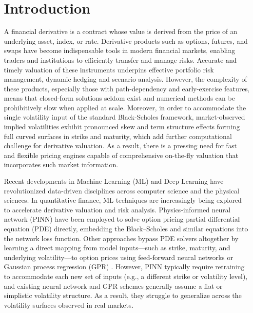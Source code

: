 \documentclass[%
 reprint,
 superscriptaddress,
nobibnotes,
 amsmath,amssymb,
 aps,
]{revtex4-2}
\begin{document}

\section{Introduction}
A financial derivative\cite{hull2016options, shreve2005stochastic} is a contract whose value is derived from the price of an underlying asset, index, or rate. Derivative products such as options\cite{black1973pricing,merton1971theory}, futures, and swaps\cite{flavell2010swaps} have become indispensable tools in modern financial markets, enabling traders and institutions to efficiently transfer and manage risks. Accurate and timely valuation of these instruments underpins effective portfolio risk management\cite{lee2010handbook}, dynamic hedging\cite{taleb1997dynamic} and scenario analysis\cite{hassani2016scenario}. However, the complexity of these products, especially those with path-dependency and early-exercise features, means that closed-form solutions seldom exist and numerical methods\cite{shreve2005stochastic, wilmott1995mathematics} can be prohibitively slow when applied at scale. Moreover, in order to accommodate the single volatility input of the standard Black-Scholes framework, market-observed implied volatilities exhibit pronounced skew and term structure effects \cite{derman2016volatility} forming full curved surfaces in strike and maturity, which add further computational challenge for derivative valuation. As a result, there is a pressing need for fast and flexible pricing engines capable of comprehensive on-the-fly valuation that incorporates such market information.

Recent developments in Machine Learning (ML)\cite{murphy2012machine,carleo2019machine} and Deep Learning\cite{goodfellow2016deep,lecun2015deep} have revolutionized data-driven disciplines across computer science and the physical sciences. In quantitative finance, ML techniques are increasingly being explored to accelerate derivative valuation and risk analysis. Physics-informed neural network (PINN) have been employed to solve option pricing partial differential equation (PDE) directly, embedding the Black–Scholes and similar equations into the network loss function\cite{gatta2023meshless, hainaut2024option, wang2023deep, bai2022application}. Other approaches bypass PDE solvers altogether by learning a direct mapping from model inputs—such as strike, maturity, and underlying volatility—to option prices using feed-forward neural networks\cite{ndikum2020machine, gaspar2020neural, anderson2023accelerated} or Gaussian process regression (GPR) \cite{de2018machine}. However, PINN typically require retraining to accommodate each new set of inputs (e.g., a different strike or volatility level), and existing neural network and GPR schemes generally assume a flat or simplistic volatility structure. As a result, they struggle to generalize across the volatility surfaces observed in real markets.
\end{document}
